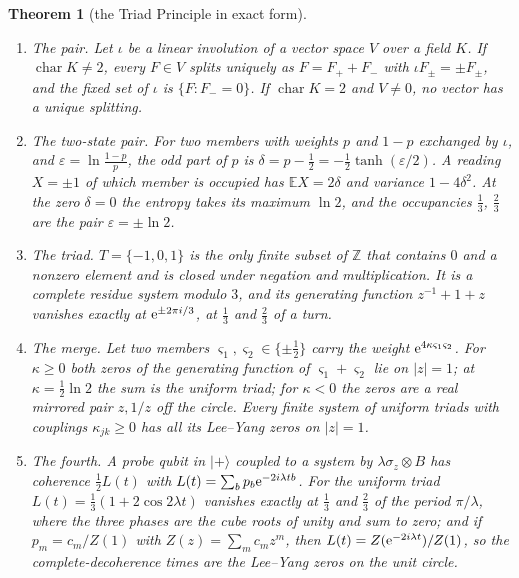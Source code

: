 \documentclass[11pt]{article}
\newtheorem{theorem}{Theorem}[section]
\theoremstyle{definition}\newtheorem{definition}[theorem]{Definition}
\theoremstyle{remark}\newtheorem{remark}[theorem]{Remark}
\begin{document}
\begin{theorem}[the Triad Principle in exact form]\label{thm:principle}
\leavevmode
\begin{enumerate}[label=\textup{(\alph*)}]
\item \emph{The pair.} Let $\iota$ be a linear involution of a vector space $V$ over a field $K$. If $\operatorname{char}K\ne2$, every $F\in V$ splits uniquely as $F=F_++F_-$ with $\iota F_\pm=\pm F_\pm$, and the fixed set of $\iota$ is $\{F:F_-=0\}$. If $\operatorname{char}K=2$ and $V\ne0$, no vector has a unique splitting.
\item \emph{The two-state pair.} For two members with weights $p$ and $1-p$ exchanged by $\iota$, and $\varepsilon=\ln\frac{1-p}p$, the odd part of $p$ is $\delta=p-\frac12=-\frac12\tanh(\varepsilon/2)$. A reading $X=\pm1$ of which member is occupied has $\mathbb EX=2\delta$ and variance $1-4\delta^2$. At the zero $\delta=0$ the entropy takes its maximum $\ln2$, and the occupancies $\frac13$, $\frac23$ are the pair $\varepsilon=\pm\ln2$.
\item \emph{The triad.} $T=\{-1,0,1\}$ is the only finite subset of $\mathbb Z$ that contains $0$ and a nonzero element and is closed under negation and multiplication. It is a complete residue system modulo $3$, and its generating function $z^{-1}+1+z$ vanishes exactly at $\mathrm e^{\pm2\pi i/3}$, at $\frac13$ and $\frac23$ of a turn.
\item \emph{The merge.} Let two members $\varsigma_1,\varsigma_2\in\{\pm\frac12\}$ carry the weight $\mathrm e^{4\kappa\varsigma_1\varsigma_2}$. For $\kappa\ge0$ both zeros of the generating function of $\varsigma_1+\varsigma_2$ lie on $|z|=1$; at $\kappa=\frac12\ln2$ the sum is the uniform triad; for $\kappa<0$ the zeros are a real mirrored pair $z,1/z$ off the circle. Every finite system of uniform triads with couplings $\kappa_{jk}\ge0$ has all its Lee--Yang zeros on $|z|=1$.
\item \emph{The fourth.} A probe qubit in $|{+}\rangle$ coupled to a system by $\lambda\sigma_z\otimes B$ has coherence $\frac12L(t)$ with $L(t)=\sum_bp_b\mathrm e^{-2i\lambda tb}$. For the uniform triad $L(t)=\frac13(1+2\cos2\lambda t)$ vanishes exactly at $\frac13$ and $\frac23$ of the period $\pi/\lambda$, where the three phases are the cube roots of unity and sum to zero; and if $p_m=c_m/Z(1)$ with $Z(z)=\sum_mc_mz^m$, then $L(t)=Z(\mathrm e^{-2i\lambda t})/Z(1)$, so the complete-decoherence times are the Lee--Yang zeros on the unit circle.
\end{enumerate}
\end{theorem}
\end{document}
